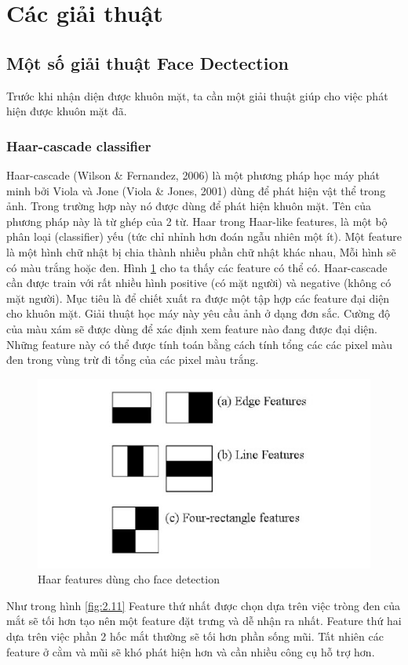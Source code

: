 \documentclass[a4paper]{report}
\begin{document}
\section{Các giải thuật}
\subsection{Một số giải thuật Face Dectection}
Trước khi nhận diện được khuôn mặt, ta cần một giải thuật giúp cho việc phát hiện được khuôn mặt đã.
\subsubsection{Haar-cascade classifier}
Haar-cascade (Wilson \& Fernandez, 2006) là một phương pháp học máy phát minh bởi Viola và Jone (Viola \& Jones, 2001) dùng để phát hiện vật thể trong ảnh. Trong trường hợp này nó được dùng để phát hiện khuôn mặt. Tên của phương pháp này là từ ghép của 2 từ. Haar trong Haar-like features, là một bộ phân loại (classifier) yếu (tức chỉ nhỉnh hơn đoán ngẫu nhiên một ít). Một feature là một hình chữ nhật bị chia thành nhiều phần chữ nhật khác nhau, Mỗi hình sẽ có màu trắng hoặc đen. Hình \ref{fig:2.10} cho ta thấy các feature có thể có. Haar-cascade cần được train với rất nhiều hình positive (có mặt người) và negative (không có mặt người). Mục tiêu là để chiết xuất ra được một tập hợp các feature đại diện cho khuôn mặt. Giải thuật học máy này yêu cầu ảnh ở dạng đơn sắc. Cường độ của màu xám sẽ được dùng để xác định xem feature nào đang được đại diện. Những feature này có thể được tính toán bằng cách tính tổng các các pixel màu đen trong vùng trừ đi tổng của các pixel màu trắng.
%
\begin{figure}[H]
\centering
\includegraphics[width=.5\textwidth]{../images/fig/2-10.png}
\caption{Haar features dùng cho face detection}
\label{fig:2.10}
\end{figure}
%
\noindent
Như trong hình \ref{fig:2.11} Feature thứ nhất được chọn dựa trên việc tròng đen của mắt sẽ tối hơn tạo nên một feature đặt trưng và dễ nhận ra nhất. Feature thứ hai dựa trên việc phần 2 hốc mắt thường sẽ tối hơn phần sống mũi. Tất nhiên các feature ở cằm và mũi sẽ khó phát hiện hơn và cần nhiều công cụ hỗ trợ hơn.
\end{document}
